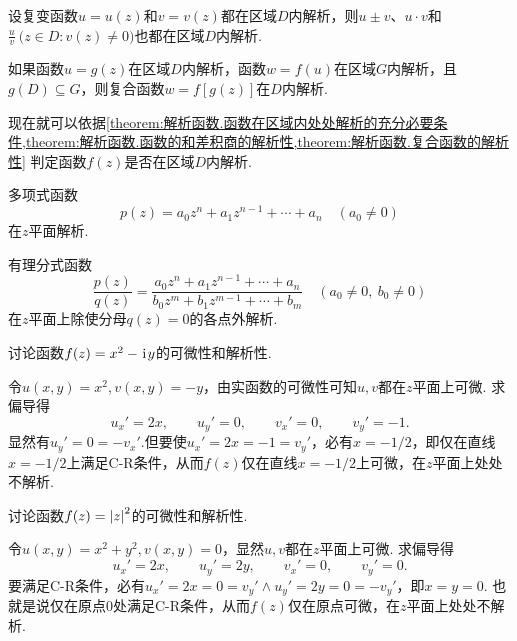 \begin{theorem}\label{theorem:解析函数.函数的和差积商的解析性}
设复变函数\(u=u(z)\)和\(v=v(z)\)都在区域\(D\)内解析，则\(u \pm v\)、\(u \cdot v\)和\(\frac{u}{v}\ \bigl( z \in D : v(z) \neq 0 \bigr)\)也都在区域\(D\)内解析.
\end{theorem}

\begin{theorem}\label{theorem:解析函数.复合函数的解析性}
如果函数\(u=g(z)\)在区域\(D\)内解析，函数\(w=f(u)\)在区域\(G\)内解析，且\(g(D) \subseteq G\)，则复合函数\(w=f[g(z)]\)在\(D\)内解析.
\end{theorem}

现在就可以依据\cref{theorem:解析函数.函数在区域内处处解析的充分必要条件,theorem:解析函数.函数的和差积商的解析性,theorem:解析函数.复合函数的解析性} 判定函数\(f(z)\)是否在区域\(D\)内解析.

\begin{example}
多项式函数\[
p(z) = a_0 z^n + a_1 z^{n-1} + \dotsb + a_n \quad (a_0 \neq 0)
\]在\(z\)平面解析.
\end{example}

\begin{example}
有理分式函数\[
\frac{p(z)}{q(z)} = \frac{a_0 z^n + a_1 z^{n-1} + \dotsb + a_n}{b_0 z^m + b_1 z^{m-1} + \dotsb + b_m} \quad (a_0 \neq 0,\ b_0 \neq 0)
\]在\(z\)平面上除使分母\(q(z)=0\)的各点外解析.
\end{example}

\begin{example}
讨论函数\(f(z) = x^2 - \kern1pt\mathrm{i}\kern1pt y\)的可微性和解析性.
\begin{solution}
令\(u(x,y) = x^2, v(x,y) = -y\)，由实函数的可微性可知\(u,v\)都在\(z\)平面上可微.
求偏导得\[
u_x' = 2x, \qquad u_y' = 0, \qquad v_x' = 0, \qquad v_y' = -1.
\]显然有\(u_y' = 0 = -v_x'\).但要使\(u_x' = 2x = -1 = v_y'\)，必有\(x = -1/2\)，即仅在直线\(x=-1/2\)上满足C-R条件，从而\(f(z)\)仅在直线\(x=-1/2\)上可微，在\(z\)平面上处处不解析.
\end{solution}
\end{example}

\begin{example}
讨论函数\(f(z) = \abs{z}^2\)的可微性和解析性.
\begin{solution}
令\(u(x,y) = x^2 + y^2, v(x,y) = 0\)，显然\(u,v\)都在\(z\)平面上可微.
求偏导得\[
u_x' = 2x, \qquad u_y' = 2y, \qquad v_x' = 0, \qquad v_y' = 0.
\]要满足C-R条件，必有\(u_x' = 2x = 0 = v_y' \land u_y' = 2y = 0 = -v_y'\)，即\(x=y=0\).
也就是说仅在原点0处满足C-R条件，从而\(f(z)\)仅在原点可微，在\(z\)平面上处处不解析.
\end{solution}
\end{example}

